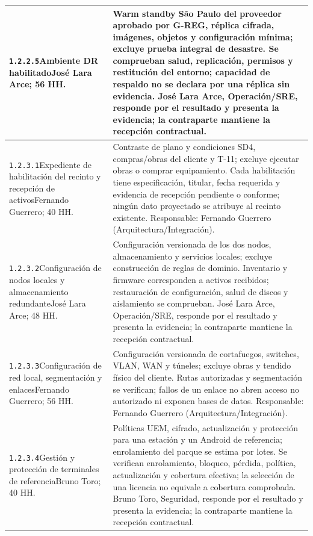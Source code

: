 \begin{longtable}{L{52mm}L{91mm}}
\texttt{1.\allowbreak{}2.\allowbreak{}2.\allowbreak{}5}\newline Ambiente DR habilitado\newline José Lara Arce; 56 HH. & Warm standby São Paulo del proveedor aprobado por G-REG, réplica cifrada, imágenes, objetos y configuración mínima; excluye prueba integral de desastre. Se comprueban salud, replicación, permisos y restitución del entorno; capacidad de respaldo no se declara por una réplica sin evidencia. José Lara Arce, Operación/SRE, responde por el resultado y presenta la evidencia; la contraparte mantiene la recepción contractual.\\\hline
\texttt{1.\allowbreak{}2.\allowbreak{}3.\allowbreak{}1}\newline Expediente de habilitación del recinto y recepción de activos\newline Fernando Guerrero; 40 HH. & Contraste de plano y condiciones SD4, compras/obras del cliente y T-11; excluye ejecutar obras o comprar equipamiento. Cada habilitación tiene especificación, titular, fecha requerida y evidencia de recepción pendiente o conforme; ningún dato proyectado se atribuye al recinto existente. Responsable: Fernando Guerrero (Arquitectura/Integración).\\\hline
\texttt{1.\allowbreak{}2.\allowbreak{}3.\allowbreak{}2}\newline Configuración de nodos locales y almacenamiento redundante\newline José Lara Arce; 48 HH. & Configuración versionada de los dos nodos, almacenamiento y servicios locales; excluye construcción de reglas de dominio. Inventario y firmware corresponden a activos recibidos; restauración de configuración, salud de discos y aislamiento se comprueban. José Lara Arce, Operación/SRE, responde por el resultado y presenta la evidencia; la contraparte mantiene la recepción contractual.\\\hline
\texttt{1.\allowbreak{}2.\allowbreak{}3.\allowbreak{}3}\newline Configuración de red local, segmentación y enlaces\newline Fernando Guerrero; 56 HH. & Configuración versionada de cortafuegos, switches, VLAN, WAN y túneles; excluye obras y tendido físico del cliente. Rutas autorizadas y segmentación se verifican; fallos de un enlace no abren acceso no autorizado ni exponen bases de datos. Responsable: Fernando Guerrero (Arquitectura/Integración).\\\hline
\texttt{1.\allowbreak{}2.\allowbreak{}3.\allowbreak{}4}\newline Gestión y protección de terminales de referencia\newline Bruno Toro; 40 HH. & Políticas UEM, cifrado, actualización y protección para una estación y un Android de referencia; enrolamiento del parque se estima por lotes. Se verifican enrolamiento, bloqueo, pérdida, política, actualización y cobertura efectiva; la selección de una licencia no equivale a cobertura comprobada. Bruno Toro, Seguridad, responde por el resultado y presenta la evidencia; la contraparte mantiene la recepción contractual.\\\hline

\end{longtable}
